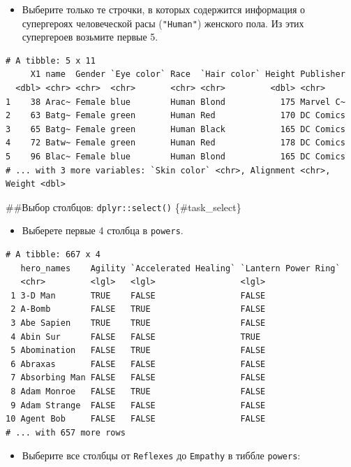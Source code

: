 \documentclass[
]{book}
\providecommand{\tightlist}{%
  \setlength{\itemsep}{0pt}\setlength{\parskip}{0pt}}
\begin{document}
\begin{itemize}
\tightlist
\item
  Выберите только те строчки, в которых содержится информация о супергероях человеческой расы (\texttt{"Human"}) женского пола. Из этих супергероев возьмите первые 5.
\end{itemize}

\begin{verbatim}
# A tibble: 5 x 11
     X1 name  Gender `Eye color` Race  `Hair color` Height Publisher
  <dbl> <chr> <chr>  <chr>       <chr> <chr>         <dbl> <chr>    
1    38 Arac~ Female blue        Human Blond           175 Marvel C~
2    63 Batg~ Female green       Human Red             170 DC Comics
3    65 Batg~ Female green       Human Black           165 DC Comics
4    72 Batw~ Female green       Human Red             178 DC Comics
5    96 Blac~ Female blue        Human Blond           165 DC Comics
# ... with 3 more variables: `Skin color` <chr>, Alignment <chr>, Weight <dbl>
\end{verbatim}

\#\#Выбор столбцов: \texttt{dplyr::select()} \{\#task\_select\}

\begin{itemize}
\tightlist
\item
  Выберете первые 4 столбца в \texttt{powers}.
\end{itemize}

\begin{verbatim}
# A tibble: 667 x 4
   hero_names    Agility `Accelerated Healing` `Lantern Power Ring`
   <chr>         <lgl>   <lgl>                 <lgl>               
 1 3-D Man       TRUE    FALSE                 FALSE               
 2 A-Bomb        FALSE   TRUE                  FALSE               
 3 Abe Sapien    TRUE    TRUE                  FALSE               
 4 Abin Sur      FALSE   FALSE                 TRUE                
 5 Abomination   FALSE   TRUE                  FALSE               
 6 Abraxas       FALSE   FALSE                 FALSE               
 7 Absorbing Man FALSE   FALSE                 FALSE               
 8 Adam Monroe   FALSE   TRUE                  FALSE               
 9 Adam Strange  FALSE   FALSE                 FALSE               
10 Agent Bob     FALSE   FALSE                 FALSE               
# ... with 657 more rows
\end{verbatim}

\begin{itemize}
\tightlist
\item
  Выберите все столбцы от \texttt{Reflexes} до \texttt{Empathy} в тиббле \texttt{powers}:
\end{itemize}
\end{document}
